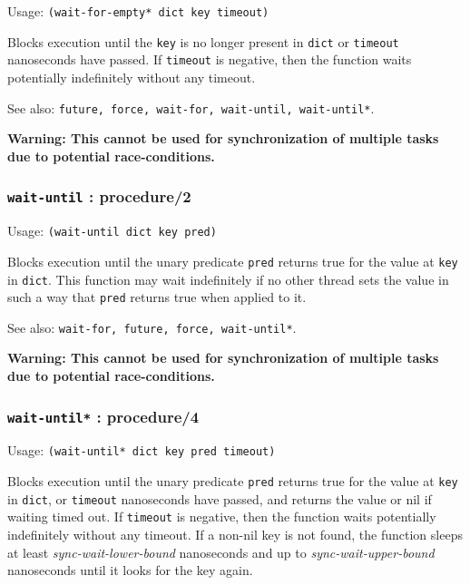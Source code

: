 \documentclass[
]{article}
\newcommand{\passthrough}[1]{#1}
\begin{document}
Usage: \passthrough{\lstinline!(wait-for-empty* dict key timeout)!}

Blocks execution until the \passthrough{\lstinline!key!} is no longer
present in \passthrough{\lstinline!dict!} or
\passthrough{\lstinline!timeout!} nanoseconds have passed. If
\passthrough{\lstinline!timeout!} is negative, then the function waits
potentially indefinitely without any timeout.

See also:
\passthrough{\lstinline!future, force, wait-for, wait-until, wait-until*!}.

\textbf{Warning: This cannot be used for synchronization of multiple
tasks due to potential race-conditions.}

\hypertarget{wait-until-procedure2}{%
\subsubsection{\texorpdfstring{\texttt{wait-until} :
procedure/2}{wait-until : procedure/2}}\label{wait-until-procedure2}}

Usage: \passthrough{\lstinline!(wait-until dict key pred)!}

Blocks execution until the unary predicate
\passthrough{\lstinline!pred!} returns true for the value at
\passthrough{\lstinline!key!} in \passthrough{\lstinline!dict!}. This
function may wait indefinitely if no other thread sets the value in such
a way that \passthrough{\lstinline!pred!} returns true when applied to
it.

See also:
\passthrough{\lstinline!wait-for, future, force, wait-until*!}.

\textbf{Warning: This cannot be used for synchronization of multiple
tasks due to potential race-conditions.}

\hypertarget{wait-until-procedure4}{%
\subsubsection{\texorpdfstring{\texttt{wait-until*} :
procedure/4}{wait-until* : procedure/4}}\label{wait-until-procedure4}}

Usage: \passthrough{\lstinline!(wait-until* dict key pred timeout)!}

Blocks execution until the unary predicate
\passthrough{\lstinline!pred!} returns true for the value at
\passthrough{\lstinline!key!} in \passthrough{\lstinline!dict!}, or
\passthrough{\lstinline!timeout!} nanoseconds have passed, and returns
the value or nil if waiting timed out. If
\passthrough{\lstinline!timeout!} is negative, then the function waits
potentially indefinitely without any timeout. If a non-nil key is not
found, the function sleeps at least \emph{sync-wait-lower-bound}
nanoseconds and up to \emph{sync-wait-upper-bound} nanoseconds until it
looks for the key again.
\end{document}
